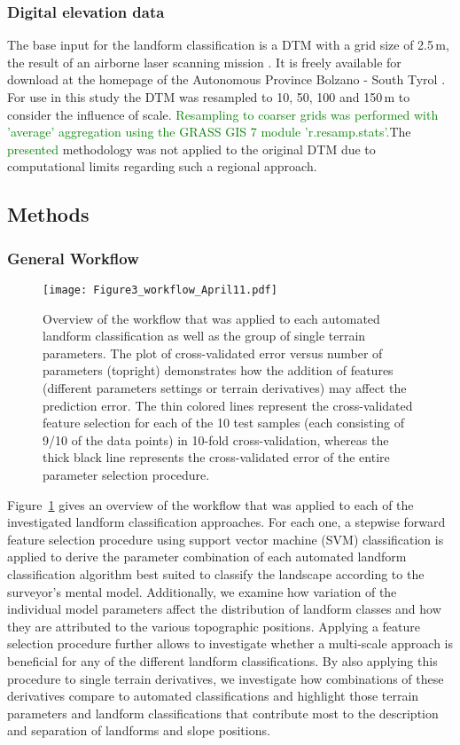 \documentclass[preprint,12pt,authoryear]{elsarticle}
\begin{document}
\subsubsection{Digital elevation data}
The base input for the landform classification is a DTM with a grid size of 2.5\,m, the result of an airborne laser scanning mission \citep{Wack2005}. It is freely available for download at the homepage of the Autonomous Province Bolzano - South Tyrol \citep{DTM}. For use in this study the DTM was resampled to 10, 50, 100 and 150\,m to consider the influence of scale. \textcolor{green}{Resampling to coarser grids was performed with 'average' aggregation using the GRASS GIS 7 module 'r.resamp.stats'.}The \textcolor{green}{presented} methodology was not applied to the original DTM due to computational limits regarding such a regional approach.
\subsection{Methods}
\subsubsection{General Workflow}
\begin{figure}
\texttt{[image: Figure3\_workflow\_April11.pdf]}
\caption{Overview of the workflow that was applied to each automated landform classification as well as the group of single terrain parameters. The plot of cross-validated error versus number of parameters (topright) demonstrates how the addition of features (different parameters settings or terrain derivatives) may affect the prediction error. The thin colored lines represent the cross-validated feature selection for each of the 10 test samples (each consisting of 9/10 of the data points) in 10-fold cross-validation, whereas the thick black line represents the cross-validated error of the entire parameter selection procedure.}
\label{fig:workflow}
\end{figure}
Figure~\ref{fig:workflow} gives an overview of the workflow that was applied to each of the investigated landform classification approaches. For each one, a stepwise forward feature selection procedure using support vector machine (SVM) classification \textcolor{green}{\cite{Cortes1995}} is applied to derive the parameter combination of each automated landform classification algorithm best suited to classify the landscape according to the surveyor's mental model. Additionally, we examine how variation of the individual model parameters affect the distribution of landform classes and how they are attributed to the various topographic positions. Applying a feature selection procedure further allows to investigate whether a multi-scale approach is beneficial for any of the different landform classifications. By also applying this procedure to single terrain derivatives, we investigate how combinations of these derivatives compare to automated classifications and highlight those terrain parameters and landform classifications that contribute most to the description and separation of landforms and slope positions.
\end{document}
